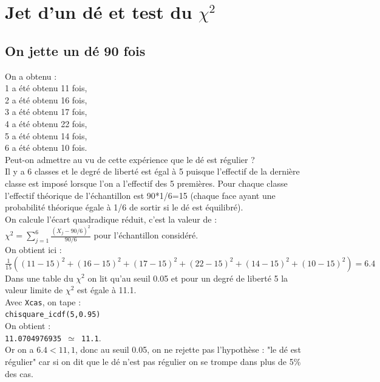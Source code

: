 \documentclass[a4paper,11pt]{book}
\begin{document}
\section{Jet d'un d\'e et test du $\chi^2$}
\subsection{On jette un d\'e 90 fois}
On a obtenu :\\
1 a \'et\'e obtenu 11 fois,\\
2 a \'et\'e obtenu 16 fois,\\
3 a \'et\'e obtenu 17 fois,\\
4 a \'et\'e obtenu 22 fois,\\
5 a \'et\'e obtenu 14 fois,\\
6 a \'et\'e obtenu 10 fois.\\
Peut-on admettre au vu de cette exp\'erience que le d\'e est r\'egulier ?\\ 
Il y a 6 classes et le degr\'e de libert\'e est \'egal \`a 5 puisque 
l'effectif de la derni\`ere classe est impos\'e lorsque l'on a l'effectif 
des 5 premi\`eres.
Pour chaque classe l'effectif th\'eorique de l'\'echantillon est 90*1/6=15 
(chaque face ayant une probabilit\'e th\'eorique \'egale \`a 1/6 de sortir si le d\'e est \'equilibr\'e).\\
On calcule l'\'ecart quadradique r\'eduit, c'est la valeur de :\\
$\chi^2=\sum_{j=1}^6 \frac{(X_j-90/6)^2}{90/6}$ pour l'\'echantillon 
consid\'er\'e.\\
On obtient ici :\\
$\frac{1}{15}((11-15)^2+(16-15)^2+(17-15)^2+(22-15)^2+(14-15)^2+(10-15)^2)=6.4$\\
Dans une table du $\chi^2$ on lit qu'au seuil 0.05 et pour un degr\'e de 
libert\'e 5 la valeur limite de $\chi^2$ est \'egale \`a 11.1.\\
Avec {\tt Xcas}, on tape :\\
{\tt chisquare\_icdf(5,0.95)}\\
On obtient : \\
{\tt 11.0704976935 $\simeq$ 11.1}.\\
 Or on a $6.4<11,1$, donc au seuil 0.05, on
 ne rejette pas l'hypoth\`ese : "le d\'e est r\'egulier" car si on dit que le 
d\'e n'est pas r\'egulier on se trompe dans plus de 5\% des cas.
\end{document}
